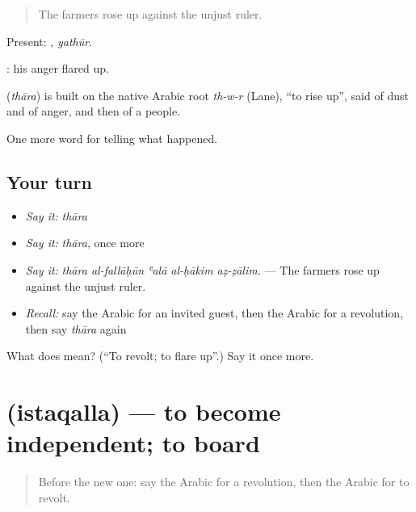 \begin{quote}
The farmers rose up against the unjust ruler.
\end{quote}

Present: , \emph{yathūr}.

 : his anger flared up.

\begin{cousinweb}
\textbf{} (\emph{thāra}) is built on the native Arabic root \emph{th-w-r} (Lane), \textquotedblleft{}to rise up\textquotedblright{}, said of dust and of anger, and then of a people.
\end{cousinweb}

\begin{grammarlens}[title={What you've built}]
One more word for telling what happened.
\end{grammarlens}

\subsection*{Your turn}
\begin{itemize}
\raggedright
  \item \emph{Say it:} \emph{thāra}
  \item \emph{Say it:} \emph{thāra}, once more
  \item \emph{Say it:} \emph{thāra al-fallāḥūn ʿalā al-ḥākim aẓ-ẓālim.} — The farmers rose up against the unjust ruler.
  \item \emph{Recall:} say the Arabic for an invited guest, then the Arabic for a revolution, then say \emph{thāra} again
\end{itemize}

\begin{tcolorbox}[breakable,colback=teal!4,colframe=teal!35!black,title={Before you move on}]
What does  mean? (\textquotedblleft{}To revolt; to flare up\textquotedblright{}.) Say it once more.
\end{tcolorbox}
\section[\texorpdfstring{\ar{استقل} (istaqalla)}{استقل (istaqalla)}]{ (istaqalla) — to become independent; to board}

\label{lesson:AR-C329-istaqalla}



\begin{quote}
Before the new one: say the Arabic for a revolution, then the Arabic for to revolt.
\end{quote}

